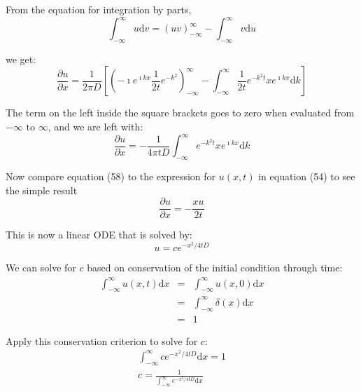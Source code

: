 \documentclass[draft, jgrga]{AGUTeX}
\begin{document}
\begin{article}
From the equation for integration by parts,
\begin{equation}
\int^\infty_{-\infty} u \mathrm{d}v = \left(uv \right)^\infty_{-\infty}
- \int^\infty_{-\infty} v \mathrm{d}u \nonumber
\end{equation}

we get:
\begin{equation}
\frac{\partial u}{\partial x} = \frac{1}{2 \pi D} \left[ \left(- \imath e^{\imath kx}
\frac{1}{2t} e^{-k^2} \right)^\infty_{-\infty} - \int^\infty_{-\infty} \frac {1}{2t}
e^{-k^2t} xe^{\imath kx} \mathrm{d}k \right]
\end{equation}

The term on the left inside the square brackets goes to zero when evaluated from \begin{math} -\infty \end{math} to \begin{math} \infty \end{math}, and we are left with:
\begin{equation}
\frac{\partial u}{\partial x} = - \frac{1}{4 \pi t D} \int^\infty_{-\infty}
e^{-k^2t}xe^{\imath kx} \mathrm{d}k
\end{equation}

Now compare equation (58) to the expression for \begin{math} u(x,t) \end{math} in equation (54) to see the simple result
\begin{equation}
\frac{\partial u}{\partial x} = - \frac{xu}{2t}
\end{equation}

This is now a linear ODE that is solved by:
\begin{equation}
u = c e^{-x^2/4tD}
\end{equation}

We can solve for $c$ based on conservation of the initial condition through time:
\begin{eqnarray}
\int^\infty_{-\infty} u(x,t) \mathrm{d}x & = & \int^\infty_{-\infty} u(x,0) \mathrm{d}x  \nonumber \\
& = & \int^\infty_{-\infty} \delta (x) \mathrm{d}x \nonumber \\
& = & 1 \nonumber
\end{eqnarray}

Apply this conservation criterion to solve for $c$:
\begin{eqnarray}
\int^\infty_{-\infty} c e^{-x^2/4tD} \mathrm{d}x = 1 \\
c = \frac{1}{\int^\infty_{-\infty} e^{-x^2/4tD} \mathrm{d}x}
\end{eqnarray}


\end{article}
\end{document}
